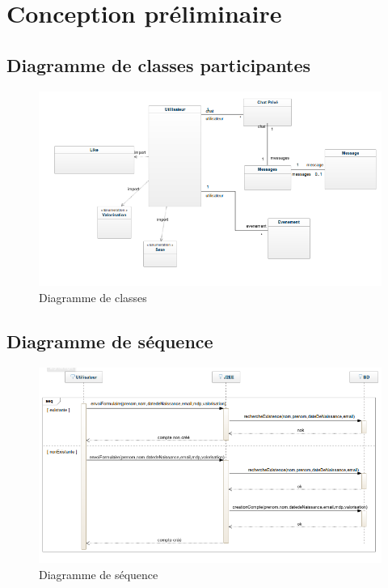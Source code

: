 \chapter{Conception préliminaire}

\section{Diagramme de classes participantes}
\vfill
\begin{figure}[ht!]
  \centering
   \caption{Diagramme de classes}
   \includegraphics[scale=0.5]{ddc1}
\end{figure}
\vfill
\newpage

\section{Diagramme de séquence}
\vfill
\begin{figure}[ht!]
  \centering
   \caption{Diagramme de séquence}
   \includegraphics[scale=0.6]{dscc}
\end{figure}
\vfill
\newpage
